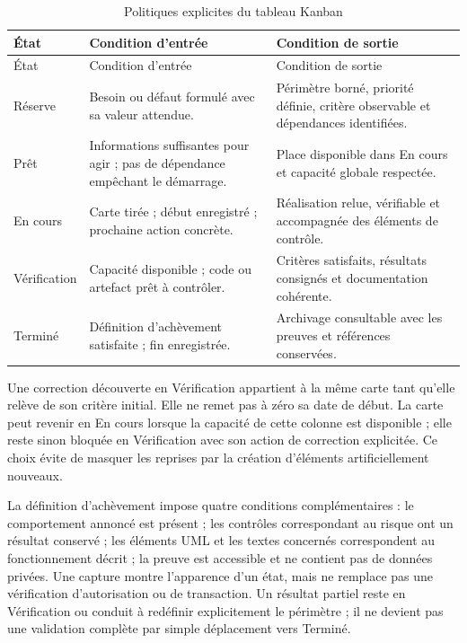 \begingroup
\small
\begin{longtable}{@{}P{0.18\textwidth}P{0.36\textwidth}P{0.38\textwidth}@{}}
\caption{Politiques explicites du tableau Kanban}\label{tab:politiques-kanban}\\
\toprule
État & Condition d'entrée & Condition de sortie \\
\midrule
\endfirsthead
\toprule
État & Condition d'entrée & Condition de sortie \\
\midrule
\endhead
Réserve & Besoin ou défaut formulé avec sa valeur attendue. & Périmètre borné, priorité définie, critère observable et dépendances identifiées. \\
Prêt & Informations suffisantes pour agir ; pas de dépendance empêchant le démarrage. & Place disponible dans En cours et capacité globale respectée. \\
En cours & Carte tirée ; début enregistré ; prochaine action concrète. & Réalisation relue, vérifiable et accompagnée des éléments de contrôle. \\
Vérification & Capacité disponible ; code ou artefact prêt à contrôler. & Critères satisfaits, résultats consignés et documentation cohérente. \\
Terminé & Définition d'achèvement satisfaite ; fin enregistrée. & Archivage consultable avec les preuves et références conservées. \\
\bottomrule
\end{longtable}
\endgroup

Une correction découverte en Vérification appartient à la même carte tant qu'elle relève de son critère initial. Elle ne remet pas à zéro sa date de début. La carte peut revenir en En cours lorsque la capacité de cette colonne est disponible ; elle reste sinon bloquée en Vérification avec son action de correction explicitée. Ce choix évite de masquer les reprises par la création d'éléments artificiellement nouveaux.

La définition d'achèvement impose quatre conditions complémentaires : le comportement annoncé est présent ; les contrôles correspondant au risque ont un résultat conservé ; les éléments UML et les textes concernés correspondent au fonctionnement décrit ; la preuve est accessible et ne contient pas de données privées. Une capture montre l'apparence d'un état, mais ne remplace pas une vérification d'autorisation ou de transaction. Un résultat partiel reste en Vérification ou conduit à redéfinir explicitement le périmètre ; il ne devient pas une validation complète par simple déplacement vers Terminé.

